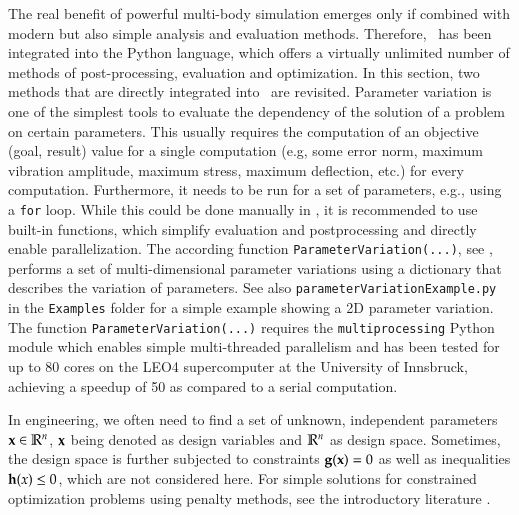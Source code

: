 %




\newpage
{}
%
The real benefit of powerful multi-body simulation emerges only if combined with modern but also simple analysis and evaluation methods.
Therefore, \codeName\ has been integrated into the Python language, which offers a virtually unlimited number of methods of post-processing, evaluation and optimization.
In this section, two methods that are directly integrated into \codeName\ are revisited.
%
\label{sec:parameterVariation}
Parameter variation is one of the simplest tools to evaluate the dependency of the solution of a problem on certain parameters. This usually requires the computation of an objective (goal, result) value for a single computation (e.g, some error norm, maximum vibration amplitude, maximum stress, maximum deflection, etc.) for every computation. Furthermore, it needs to be run for a set of parameters, e.g., using a \texttt{for} loop.
While this could be done manually in \codeName , it is recommended to use built-in functions, which simplify evaluation and postprocessing and directly enable parallelization.
The according function \texttt{ParameterVariation(...)}, see , performs a set of multi-dimensional parameter variations using a dictionary that describes the variation of parameters. See also \texttt{parameterVariationExample.py} in the \texttt{Examples} folder for a simple example showing a 2D parameter variation. The function \texttt{ParameterVariation(...)} requires the \texttt{multiprocessing} Python module which enables simple multi-threaded parallelism and has been tested for up to 80 cores on the LEO4 supercomputer at the University of Innsbruck, achieving a speedup of 50 as compared to a serial computation.

\label{sec:optimization}
%
In engineering, we often need to find a set of unknown, independent parameters $\mathbf{x} \in \mathbb{R}^n$, $\mathbf{x}$ being denoted as design variables and $\mathbb{R}^n$ as design space. Sometimes, the design space is further subjected to constraints $\mathbf{g}(\mathbf{x})=0$ as well as inequalities $\mathbf{h}(x) \le 0$, which are not considered here. For simple solutions for constrained optimization problems using penalty methods, see the introductory literature \cite{Kiusalaas2013}.

